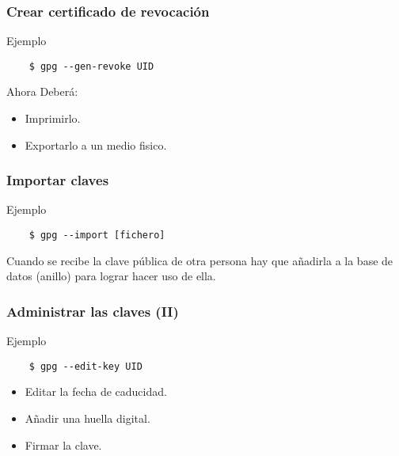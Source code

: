 \documentclass{beamer}
\newenvironment{ejemplo}{\begin{exampleblock}{Ejemplo}}{\end{exampleblock}}
\begin{document}
\begin{frame}[fragile]
    \frametitle{Crear certificado de revocación}

    \begin{ejemplo}
    \begin{verbatim}
    $ gpg --gen-revoke UID
    \end{verbatim}
    \end{ejemplo}

    Ahora Deberá:

    \begin{itemize}[<+->]
        \item
        Imprimirlo.
        \item
        Exportarlo a un medio fisico.
    \end{itemize}
\end{frame}

\begin{frame}[fragile]
    \frametitle{Importar claves}

    \begin{ejemplo}
    \begin{verbatim}
    $ gpg --import [fichero]
    \end{verbatim}
    \end{ejemplo}

    Cuando se recibe la clave pública de otra persona hay que añadirla a la
    base de datos (anillo) para lograr hacer uso de ella.
\end{frame}


\begin{frame}[fragile]
    \frametitle{Administrar las claves (II)}

    \begin{ejemplo}
    \begin{verbatim}
    $ gpg --edit-key UID
    \end{verbatim}
    \end{ejemplo}

    \begin{itemize}
        \item
        Editar la fecha de caducidad.
        \item
        Añadir una huella digital.
        \item
        Firmar la clave.
    \end{itemize}
\end{frame}
\end{document}
